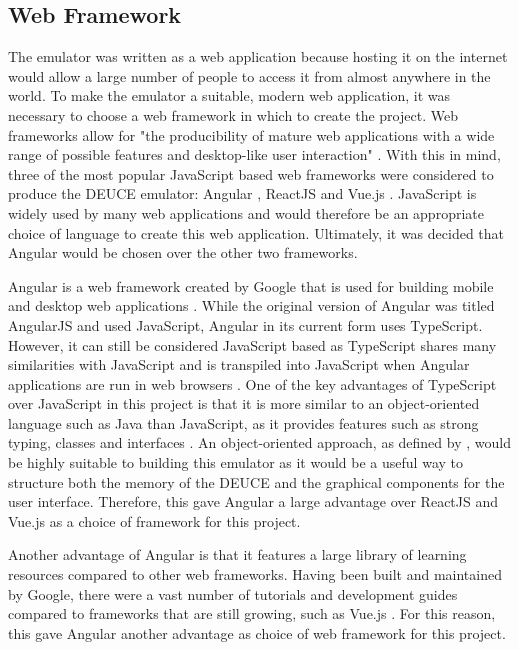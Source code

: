 \documentclass{l4proj}
\begin{document}
\subsection{Web Framework}
The emulator was written as a web application because hosting it on the internet would allow a large number of people to access it from almost anywhere in the world. To make the emulator a suitable, modern web application, it was necessary to choose a web framework in which to create the project. Web frameworks allow for "the producibility of mature web applications with a wide range of possible features and desktop-like user interaction" \citep{kersten10}. With this in mind, three of the most popular JavaScript based web frameworks were considered to produce the DEUCE emulator: Angular \citep{angular19}, ReactJS \citep{react19} and Vue.js \citep{vue19}. JavaScript is widely used by many web applications \citep{javascript15} and would therefore be an appropriate choice of language to create this web application. Ultimately, it was decided that Angular would be chosen over the other two frameworks.

Angular is a web framework created by Google that is used for building mobile and desktop web applications \citep{angular19}. While the original version of Angular was titled AngularJS and used JavaScript, Angular in its current form uses TypeScript. However, it can still be considered JavaScript based as TypeScript shares many similarities with JavaScript and is transpiled into JavaScript when Angular applications are run in web browsers \citep{Clow18}. One of the key advantages of TypeScript over JavaScript in this project is that it is more similar to an object-oriented language such as Java than JavaScript, as it provides features such as strong typing, classes and interfaces \citep{typescript18}. An object-oriented approach, as defined by \citet{chambers14}, would be highly suitable to building this emulator as it would be a useful way to structure both the memory of the DEUCE and the graphical components for the user interface. Therefore, this gave Angular a large advantage over ReactJS and Vue.js as a choice of framework for this project.

Another advantage of Angular is that it features a large library of learning resources compared to other web frameworks. Having been built and maintained by Google, there were a vast number of tutorials and development guides compared to frameworks that are still growing, such as Vue.js \citep{vue19}. For this reason, this gave Angular another advantage as choice of web framework for this project.
\end{document}
